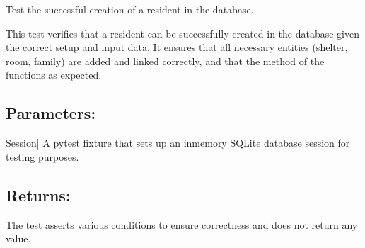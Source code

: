\documentclass[letterpaper,10pt,english]{sphinxmanual}
\begin{document}
\begin{fulllineitems}
\label{\detokenize{test:test.test_residetnt.test_create_resident_success}}
\pysigstartsignatures
\pysiglinewithargsret
{}
{}
{}
\pysigstopsignatures
\sphinxAtStartPar
Test the successful creation of a resident in the database.

\sphinxAtStartPar
This test verifies that a resident can be successfully created in the database
given the correct setup and input data. It ensures that all necessary entities
(shelter, room, family) are added and linked correctly, and that the 
method of the  functions as expected.


\subsection{Parameters:}
\label{\detokenize{test:id7}}\begin{description}
\sphinxlineitem{setup\_database}{[}Session{]}
\sphinxAtStartPar
A pytest fixture that sets up an in\sphinxhyphen{}memory SQLite database session
for testing purposes.

\end{description}


\subsection{Returns:}
\label{\detokenize{test:id8}}\begin{description}
\sphinxAtStartPar
The test asserts various conditions to ensure correctness and does not
return any value.

\end{description}

\end{fulllineitems}

\end{document}
